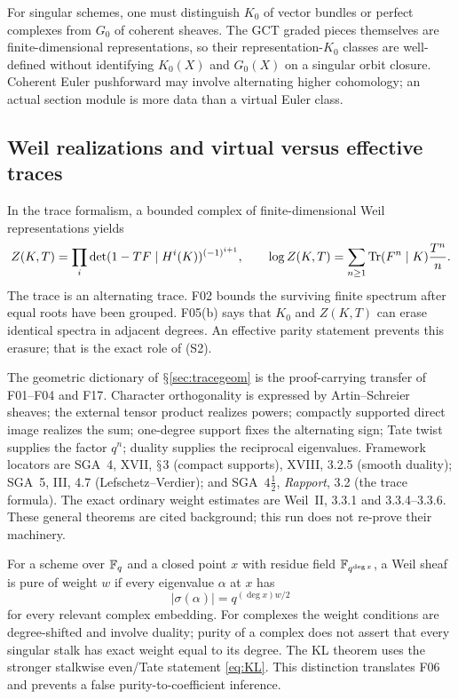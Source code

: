 \documentclass[11pt,a4paper]{article}
\renewcommand{\S}{\ensuremath{\mathsection}}
\newcommand{\fid}[1]{\textsf{#1}}\newcommand{\gate}[1]{\textsf{#1}}
\theoremstyle{named}\newtheorem{finding}{Finding}[section]
\theoremstyle{definition}\newtheorem{definition}[finding]{Definition}
\theoremstyle{remark}\newtheorem{remark}[finding]{Remark}
\begin{document}
For singular schemes, one must distinguish $K_0$ of vector bundles or perfect complexes from $G_0$ of coherent sheaves. The GCT graded pieces themselves are finite-dimensional representations, so their representation-$K_0$ classes are well-defined without identifying $K_0(X)$ and $G_0(X)$ on a singular orbit closure. Coherent Euler pushforward may involve alternating higher cohomology; an actual section module is more data than a virtual Euler class.

\subsection{Weil realizations and virtual versus effective traces}
In the trace formalism, a bounded complex of finite-dimensional Weil representations yields
\[
 Z(K,T)=\prod_i\det(1-TF\mid H^i(K))^{(-1)^{i+1}},\qquad
 \log Z(K,T)=\sum_{n\ge1}\operatorname{Tr}(F^n\mid K)\frac{T^n}{n}.
\]
The trace is an alternating trace. \fid{F02} bounds the surviving finite spectrum after equal roots have been grouped. \fid{F05}(b) says that $K_0$ and $Z(K,T)$ can erase identical spectra in adjacent degrees. An effective parity statement prevents this erasure; that is the exact role of (S2).

The geometric dictionary of \S\ref{sec:tracegeom} is the proof-carrying transfer of \fid{F01}--\fid{F04} and \fid{F17}. Character orthogonality is expressed by Artin--Schreier sheaves; the external tensor product realizes powers; compactly supported direct image realizes the sum; one-degree support fixes the alternating sign; Tate twist supplies the factor $q^n$; duality supplies the reciprocal eigenvalues. Framework locators are SGA~4, XVII, \S3 (compact supports), XVIII, 3.2.5 (smooth duality); SGA~5, III, 4.7 (Lefschetz--Verdier); and SGA~$4\frac12$, \emph{Rapport}, 3.2 (the trace formula). The exact ordinary weight estimates are Weil~II, 3.3.1 and 3.3.4--3.3.6. These general theorems are cited background; this run does not re-prove their machinery.

For a scheme over $\mathbb F_q$ and a closed point $x$ with residue field $\mathbb F_{q^{\deg x}}$, a Weil sheaf is pure of weight $w$ if every eigenvalue $\alpha$ at $x$ has
\[
 |\sigma(\alpha)|=q^{(\deg x)w/2}
\]
for every relevant complex embedding. For complexes the weight conditions are degree-shifted and involve duality; purity of a complex does not assert that every singular stalk has exact weight equal to its degree. The KL theorem uses the stronger stalkwise even/Tate statement \eqref{eq:KL}. This distinction translates \fid{F06} and prevents a false purity-to-coefficient inference.
\end{document}
